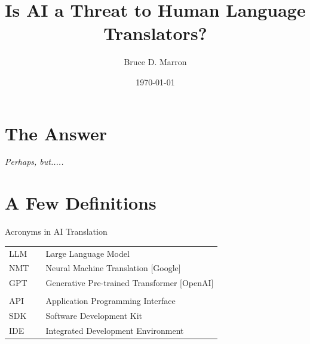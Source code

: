 \documentclass{beamer}
\title{Is AI a Threat to Human Language Translators?}
\date{\today}
\author{Bruce D. Marron}
\begin{document}
\begin{frame}
  \titlepage
\end{frame}

\section{The Answer}

\begin{frame}

\begin{center}
\large \textit{Perhaps, but.....}
\end{center}

\end{frame}


\section{A Few Definitions}

\begin{frame} {Acronyms in AI Translation}
 \begin{table}
\begin{tabular}{lll}
LLM  &   &    Large Language Model\\
NMT  &   &  Neural Machine Translation [Google] \\
GPT  &   &    Generative Pre-trained Transformer	[OpenAI]\\
     &   & \\
API  &   &    Application Programming Interface\\
SDK &    &    Software Development Kit\\
IDE  &   &    Integrated Development Environment\\
\end{tabular}
\end{table}

\end{frame}
\end{document}
